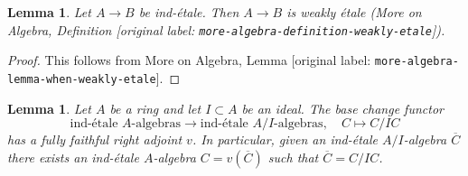 \documentclass[10pt,a4paper]{article}
\theoremstyle{plain}
\newtheorem{lemma}[subsection]{Lemma}
\theoremstyle{definition}
\theoremstyle{remark}
\numberwithin{equation}{subsection}
\begin{document}
\begin{lemma}
\label{lemma-ind-etale-implies}
Let $A \to B$ be ind-\'etale. Then $A \to B$ is weakly \'etale
(More on Algebra, Definition \textnormal{[original label: \nolinkurl{more-algebra-definition-weakly-etale}]}).
\end{lemma}

\begin{proof}
This follows from More on Algebra, Lemma
\textnormal{[original label: \nolinkurl{more-algebra-lemma-when-weakly-etale}]}.
\end{proof}

\begin{lemma}
\label{lemma-lift-ind-etale}
Let $A$ be a ring and let $I \subset A$ be an ideal. The base change functor
$$
\text{ind-\'etale }A\text{-algebras}
\longrightarrow
\text{ind-\'etale }A/I\text{-algebras},\quad
C \longmapsto C/IC
$$
has a fully faithful right adjoint $v$. In particular, given
an ind-\'etale $A/I$-algebra $\overline{C}$ there exists
an ind-\'etale $A$-algebra $C = v(\overline{C})$ such that
$\overline{C} = C/IC$.
\end{lemma}
\end{document}
